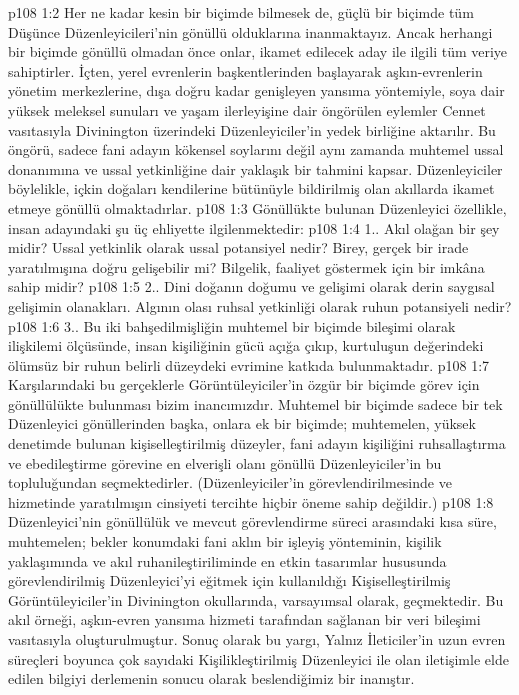 \vs p108 1:2 Her ne kadar kesin bir biçimde bilmesek de, güçlü bir biçimde tüm Düşünce Düzenleyicileri’nin gönüllü olduklarına inanmaktayız. Ancak herhangi bir biçimde gönüllü olmadan önce onlar, ikamet edilecek aday ile ilgili tüm veriye sahiptirler. İçten, yerel evrenlerin başkentlerinden başlayarak aşkın\hyp{}evrenlerin yönetim merkezlerine, dışa doğru kadar genişleyen yansıma yöntemiyle, soya dair yüksek meleksel sunuları ve yaşam ilerleyişine dair öngörülen eylemler Cennet vasıtasıyla Divinington üzerindeki Düzenleyiciler’in yedek birliğine aktarılır. Bu öngörü, sadece fani adayın kökensel soylarını değil aynı zamanda muhtemel ussal donanımına ve ussal yetkinliğine dair yaklaşık bir tahmini kapsar. Düzenleyiciler böylelikle, içkin doğaları kendilerine bütünüyle bildirilmiş olan akıllarda ikamet etmeye gönüllü olmaktadırlar.
\vs p108 1:3 Gönüllükte bulunan Düzenleyici özellikle, insan adayındaki şu üç ehliyette ilgilenmektedir:
\vs p108 1:4 1.. Akıl olağan bir şey midir? Ussal yetkinlik olarak ussal potansiyel nedir? Birey, gerçek bir irade yaratılmışına doğru gelişebilir mi? Bilgelik, faaliyet göstermek için bir imkâna sahip midir?
\vs p108 1:5 2.\bibnobreakspace {}. Dini doğanın doğumu ve gelişimi olarak derin saygısal gelişimin olanakları. Algının olası ruhsal yetkinliği olarak ruhun potansiyeli nedir?
\vs p108 1:6 3.\bibnobreakspace {}. Bu iki bahşedilmişliğin muhtemel bir biçimde bileşimi olarak ilişkilemi ölçüsünde, insan kişiliğinin gücü açığa çıkıp, kurtuluşun değerindeki ölümsüz bir ruhun belirli düzeydeki evrimine katkıda bulunmaktadır.
\vs p108 1:7 Karşılarındaki bu gerçeklerle Görüntüleyiciler’in özgür bir biçimde görev için gönüllülükte bulunması bizim inancımızdır. Muhtemel bir biçimde sadece bir tek Düzenleyici gönüllerinden başka, onlara ek bir biçimde; muhtemelen, yüksek denetimde bulunan kişiselleştirilmiş düzeyler, fani adayın kişiliğini ruhsallaştırma ve ebedileştirme görevine en elverişli olanı gönüllü Düzenleyiciler’in bu topluluğundan seçmektedirler. (Düzenleyiciler’in görevlendirilmesinde ve hizmetinde yaratılmışın cinsiyeti tercihte hiçbir öneme sahip değildir.)
\vs p108 1:8 Düzenleyici’nin gönüllülük ve mevcut görevlendirme süreci arasındaki kısa süre, muhtemelen; bekler konumdaki fani aklın bir işleyiş yönteminin, kişilik yaklaşımında ve akıl ruhanileştiriliminde en etkin tasarımlar hususunda görevlendirilmiş Düzenleyici’yi eğitmek için kullanıldığı Kişiselleştirilmiş Görüntüleyiciler’in Divinington okullarında, varsayımsal olarak, geçmektedir. Bu akıl örneği, aşkın\hyp{}evren yansıma hizmeti tarafından sağlanan bir veri bileşimi vasıtasıyla oluşturulmuştur. Sonuç olarak bu yargı, Yalnız İleticiler’in uzun evren süreçleri boyunca çok sayıdaki Kişilikleştirilmiş Düzenleyici ile olan iletişimle elde edilen bilgiyi derlemenin sonucu olarak beslendiğimiz bir inanıştır.
